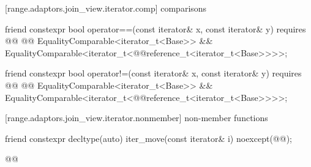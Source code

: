 {[range.adaptors.join_view.iterator.comp]{ comparisons}

\begin{itemdecl}
friend constexpr bool operator==(const iterator& x, const iterator& y)
  requires @@
    @@ EqualityComparable<iterator_t<Base>> &&
    EqualityComparable<iterator_t<@@reference_t<iterator_t<Base>>>>;
\end{itemdecl}

\begin{itemdescr}
\pnum
\oldtxt{\returns} 
\end{itemdescr}

\begin{itemdecl}
friend constexpr bool operator!=(const iterator& x, const iterator& y)
  requires @@
    @@ EqualityComparable<iterator_t<Base>> &&
    EqualityComparable<iterator_t<@@reference_t<iterator_t<Base>>>>;
\end{itemdecl}

\begin{itemdescr}
\pnum
\oldtxt{\returns} 
\end{itemdescr}

[range.adaptors.join_view.iterator.nonmember]{ non-member functions}

\begin{itemdecl}
friend constexpr decltype(auto) iter_move(const iterator& i)
  noexcept(@\oldtxt{\seebelow}@);
\end{itemdecl}

\begin{itemdescr}
\pnum
\oldtxt{\returns} 

\pnum
{}
\begin{codeblock}
@@
\end{codeblock}
\end{itemdescr}

}
